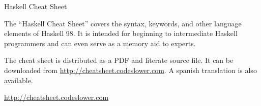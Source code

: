\begin{hcarentry}{Haskell Cheat Sheet}
\makeheader

The ``Haskell Cheat Sheet'' covers the syntax, keywords, and other
language elements of Haskell 98. It is intended for beginning to
intermediate Haskell programmers and can even serve as a memory aid to
experts.

The cheat sheet is distributed as a PDF and literate source file. It
can be downloaded from \url{http://cheatsheet.codeslower.com}.  A
spanish translation is also available.

\FurtherReading
  \url{http://cheatsheet.codeslower.com}
\end{hcarentry}
